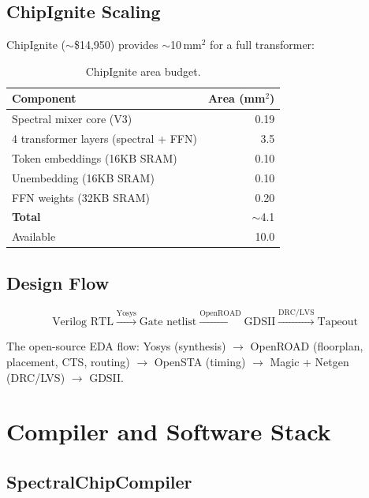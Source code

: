 \documentclass[11pt,a4paper]{article}
\theoremstyle{definition}
\theoremstyle{remark}
\begin{document}
\subsection{ChipIgnite Scaling}

ChipIgnite ($\sim$\$14{,}950) provides $\sim$10\,mm$^2$ for a full transformer:
\begin{table}[h]
\centering
\caption{ChipIgnite area budget.}
\label{tab:chipignite}
\begin{tabular}{lr}
\toprule
\textbf{Component} & \textbf{Area (mm$^2$)} \\
\midrule
Spectral mixer core (V3) & 0.19 \\
4 transformer layers (spectral + FFN) & 3.5 \\
Token embeddings (16KB SRAM) & 0.10 \\
Unembedding (16KB SRAM) & 0.10 \\
FFN weights (32KB SRAM) & 0.20 \\
\midrule
\textbf{Total} & $\sim$4.1 \\
Available & 10.0 \\
\bottomrule
\end{tabular}
\end{table}

\subsection{Design Flow}

\begin{equation}
  \text{Verilog RTL} \xrightarrow{\text{Yosys}} \text{Gate netlist}
  \xrightarrow{\text{OpenROAD}} \text{GDSII}
  \xrightarrow{\text{DRC/LVS}} \text{Tapeout}
\end{equation}

The open-source EDA flow: Yosys (synthesis) $\to$ OpenROAD (floorplan, placement,
CTS, routing) $\to$ OpenSTA (timing) $\to$ Magic + Netgen (DRC/LVS) $\to$ GDSII.

\section{Compiler and Software Stack}

\subsection{SpectralChipCompiler}
\end{document}
